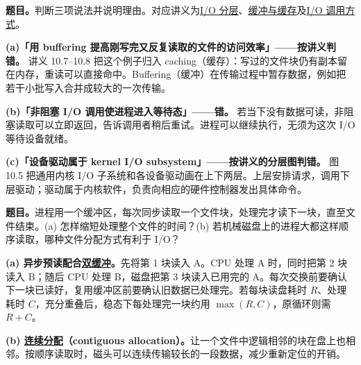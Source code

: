 \begingroup
\setlength{\parskip}{0.4em}
\renewcommand{\recordid}[1]{}
\renewcommand{\relatedtopic}[2]{\hyperref[topic:#1]{#2}}

\label{tutorial:SC2005-TUT12}



\textbf{题目。}判断三项说法并说明理由。对应讲义为\relatedtopic{SC2005-L22-T01}{I/O 分层}、\relatedtopic{SC2005-L22-T02}{缓冲与缓存}及\relatedtopic{SC2005-L22-T03}{I/O 调用方式}。

\begin{checkedsolution}
\textbf{(a)「用 buffering 提高刚写完又反复读取的文件的访问效率」——按讲义判错。}
讲义 10.7--10.8 把这个例子归入 caching（缓存）：写过的文件块仍有副本留在内存，重读可以直接命中。Buffering（缓冲）在传输过程中暂存数据，例如把若干小批写入合并成较大的一次传输。

\textbf{(b)「非阻塞 I/O 调用使进程进入等待态」——错。}
若当下没有数据可读，非阻塞读取可以立即返回，告诉调用者稍后重试。进程可以继续执行，无须为这次 I/O 等待设备就绪。

\textbf{(c)「设备驱动属于 kernel I/O subsystem」——按讲义的分层图判错。}
图 10.5 把通用内核 I/O 子系统和各设备驱动画在上下两层。上层安排请求，调用下层驱动；驱动属于内核软件，负责向相应的硬件控制器发出具体命令。
\end{checkedsolution}


\textbf{题目。}进程用一个缓冲区，每次同步读取一个文件块，处理完才读下一块，直至文件结束。(a) 怎样缩短处理整个文件的时间？(b) 若机械磁盘上的进程大都这样顺序读取，哪种文件分配方式有利于 I/O？

\begin{checkedsolution}
\textbf{(a) 异步预读配合\relatedtopic{SC2005-L22-T03}{双缓冲}。}先将第 1 块读入 A。CPU 处理 A 时，同时把第 2 块读入 B；随后 CPU 处理 B，磁盘把第 3 块读入已用完的 A。每次交换前要确认下一块已读好，复用缓冲区前要确认旧数据已处理完。若每块读盘耗时 $R$、处理耗时 $C$，充分重叠后，稳态下每处理完一块约用 $\max(R,C)$，原循环则需 $R+C$。

\textbf{(b) \relatedtopic{SC2005-L21-T01}{连续分配}（contiguous allocation）。}让一个文件中逻辑相邻的块在盘上也相邻。按顺序读取时，磁头可以连续传输较长的一段数据，减少重新定位的开销。
\end{checkedsolution}

